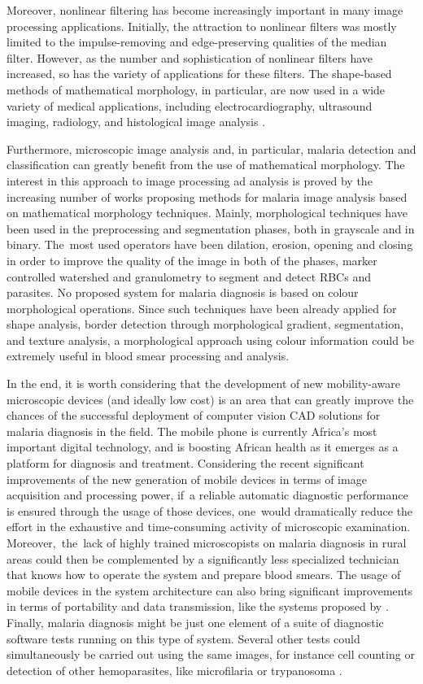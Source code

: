\documentclass[sensors,review,accept,moreauthors,pdftex,10pt,a4paper]{mdpi}
\begin{document}
Moreover, nonlinear filtering has become increasingly important in many image processing applications. Initially, the attraction to nonlinear filters was mostly limited to the impulse-removing and edge-preserving qualities of the median filter. However, as the number and sophistication of nonlinear filters have increased, so has the variety of applications for these filters. The shape-based methods of mathematical morphology, in particular, are now used in a wide variety of medical applications, including electrocardiography, ultrasound imaging, radiology, and histological image analysis \cite{Schulze1994}.

Furthermore, microscopic image analysis and, in particular, malaria detection and classification can greatly benefit from the use of mathematical morphology. The interest in this approach to image processing ad analysis is proved by the increasing number of works proposing methods for malaria image analysis based on mathematical morphology techniques.
Mainly, morphological techniques have been used in the preprocessing and segmentation phases, both in grayscale and in binary. The~most used operators have been dilation, erosion, opening and closing in order to improve the quality of the image in both of the phases, marker controlled watershed and granulometry to segment and detect RBCs and parasites.
No proposed system for malaria diagnosis is based on colour morphological operations. Since such techniques have been already applied for shape analysis, border detection through morphological gradient, segmentation, and texture analysis, a morphological approach using colour information could be extremely useful in blood smear processing and analysis.

In the end, it is worth considering that the development of new mobility-aware microscopic devices (and ideally low cost) is an area that can greatly improve the chances of the successful deployment of computer vision CAD solutions for malaria diagnosis in the field.
The mobile phone is currently Africa's most important digital technology, and is boosting African health as it emerges as a platform for diagnosis and treatment.
Considering the recent significant improvements of the new generation of mobile devices in terms of image acquisition and processing power, if~a reliable automatic diagnostic performance is ensured through the usage of those devices, one~would dramatically reduce the effort in the exhaustive and time-consuming activity of microscopic examination.
\mbox{Moreover, the lack} of highly trained microscopists on malaria diagnosis in rural areas could then be complemented by a significantly less specialized technician that knows how to operate the system and prepare blood smears. The usage of mobile devices in the system architecture can also bring significant improvements in terms of portability and data transmission, like the systems proposed by \cite{Oliveira2017,Rosado2017}.
Finally, malaria diagnosis might be just one element of a suite of diagnostic software tests running on this type of system. Several other tests could simultaneously be carried out using the same images, for instance cell counting or detection of other hemoparasites, like microfilaria or trypanosoma \cite{Rosado2016}.
\end{document}
